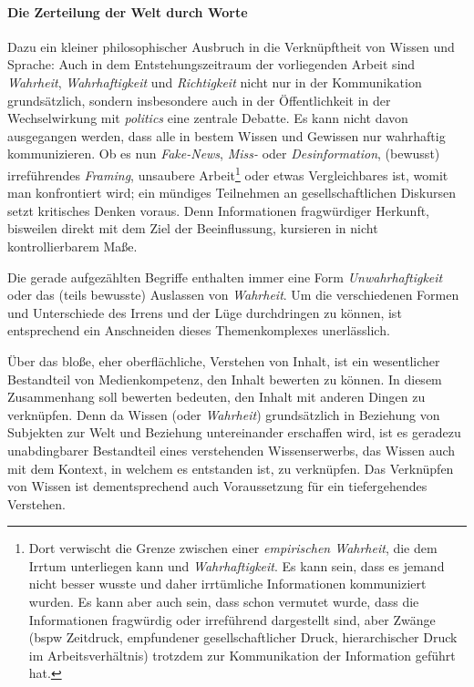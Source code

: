 \paragraph{Die Zerteilung der Welt durch Worte}
Dazu ein kleiner philosophischer Ausbruch in die Verknüpftheit von Wissen und Sprache: Auch in dem Entstehungszeitraum der vorliegenden Arbeit sind \emph{Wahrheit}, \emph{Wahrhaftigkeit} und \emph{Richtigkeit} nicht nur in der Kommunikation grundsätzlich, sondern insbesondere auch in der Öffentlichkeit in der Wechselwirkung mit \emph{politics} eine zentrale Debatte. Es kann nicht davon ausgegangen werden, dass alle in bestem Wissen und Gewissen nur wahrhaftig kommunizieren. 
Ob es nun \emph{Fake-News}, \emph{Miss-} oder \emph{Desinformation}, (bewusst) irreführendes \emph{Framing}, unsaubere Arbeit\footnote{
    Dort verwischt die Grenze zwischen einer \emph{empirischen Wahrheit}, die dem Irrtum unterliegen kann und \emph{Wahrhaftigkeit}. Es kann sein, dass es jemand nicht besser wusste und daher irrtümliche Informationen kommuniziert wurden. Es kann aber auch sein, dass schon vermutet wurde, dass die Informationen fragwürdig oder irreführend dargestellt sind, aber Zwänge (\gls{bspw} Zeitdruck, empfundener gesellschaftlicher Druck, hierarchischer Druck im Arbeitsverhältnis) trotzdem zur Kommunikation der Information geführt hat.} 
oder etwas Vergleichbares ist, womit man konfrontiert wird; ein mündiges Teilnehmen an gesellschaftlichen Diskursen setzt kritisches Denken voraus. Denn Informationen fragwürdiger Herkunft, bisweilen direkt mit dem Ziel der Beeinflussung, kursieren in nicht kontrollierbarem Maße. 

Die gerade aufgezählten Begriffe enthalten immer eine Form \emph{Unwahrhaftigkeit} oder das (teils bewusste) Auslassen von \emph{Wahrheit}. Um die verschiedenen Formen und Unterschiede des Irrens und der Lüge durchdringen zu können, ist entsprechend ein Anschneiden dieses Themenkomplexes unerlässlich.  

Über das bloße, eher oberflächliche, Verstehen von Inhalt, ist ein wesentlicher Bestandteil von Medienkompetenz, den Inhalt bewerten zu können. In diesem Zusammenhang soll bewerten bedeuten, den Inhalt mit anderen Dingen zu verknüpfen. Denn da Wissen (oder \emph{Wahrheit}) grundsätzlich in Beziehung von Subjekten zur Welt und Beziehung untereinander erschaffen wird, ist es geradezu unabdingbarer Bestandteil eines verstehenden Wissenserwerbs, das Wissen auch mit dem Kontext, in welchem es entstanden ist, zu verknüpfen. Das Verknüpfen von Wissen ist dementsprechend auch Voraussetzung für ein tiefergehendes Verstehen. 

